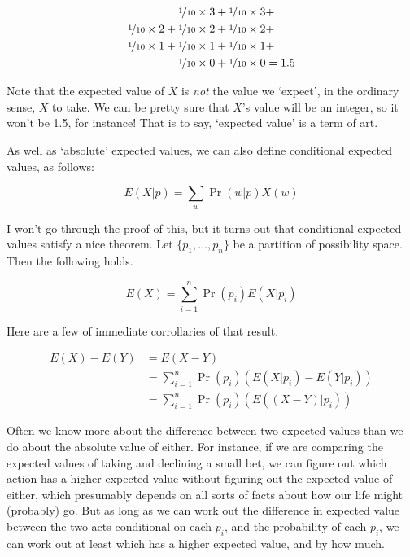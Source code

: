 \documentclass[openany]{book}
\begin{document}
\begin{align*}
\nicefrac{1}{10} \times 3 + \nicefrac{1}{10} \times 3 &+ \\
\nicefrac{1}{10} \times 2 + \nicefrac{1}{10} \times 2 + \nicefrac{1}{10} \times 2 &+ \\
\nicefrac{1}{10} \times 1 + \nicefrac{1}{10} \times 1 + \nicefrac{1}{10} \times 1 &+ \\
\nicefrac{1}{10} \times 0 + \nicefrac{1}{10} \times 0 &= 1.5 \\
\end{align*}

\noindent Note that the expected value of $X$ is \textit{not} the value we `expect', in the ordinary sense, $X$ to take. We can be pretty sure that $X$'s value will be an integer, so it won't be 1.5, for instance! That is to say, `expected value' is a term of art.

As well as `absolute' expected values, we can also define conditional expected values, as follows:

\begin{equation*}
E(X | p) = \sum_w \Pr(w | p)X(w)
\end{equation*}

\noindent I won't go through the proof of this, but it turns out that conditional expected values satisfy a nice theorem. Let $\{p_1, \dots, p_n\}$ be a partition of possibility space. Then the following holds.

\begin{equation*}
E(X) = \sum_{i=1}^n \Pr(p_i) E(X | p_i)
\end{equation*}

\noindent Here are a few of immediate corrollaries of that result.

\begin{align*}
E(X) -E(Y) &= E(X - Y) \\
&= \sum_{i=1}^n \Pr(p_i) (E(X | p_i) - E(Y | p_i)) \\
&= \sum_{i=1}^n \Pr(p_i) (E((X - Y) | p_i)) 
\end{align*}

\noindent Often we know more about the difference between two expected values than we do about the absolute value of either. For instance, if we are comparing the expected values of taking and declining a small bet, we can figure out which action has a higher expected value without figuring out the expected value of either, which presumably depends on all sorts of facts about how our life might (probably) go. But as long as we can work out the difference in expected value between the two acts conditional on each $p_i$, and the probability of each $p_i$, we can work out at least which has a higher expected value, and by how much.
\end{document}
